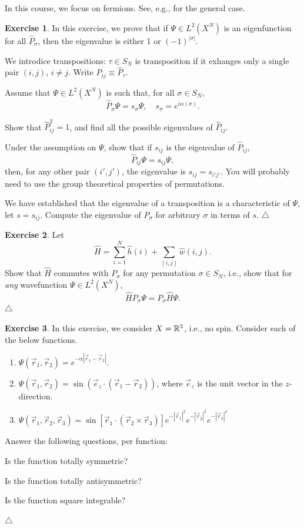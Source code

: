 \documentclass{report}
\theoremstyle{plain}
\theoremstyle{definition}
\newtheorem{exerc}{Exercise}[chapter]
\newcommand\xqed[1]{%
  \leavevmode\unskip\penalty9999 \hbox{}\nobreak\hfill
  \quad\hbox{#1}}
\newcommand\demo{\xqed{$\triangle$}}
\newenvironment{exercise}{\bigskip\begin{exerc}}{\demo\end{exerc}\bigskip}
\begin{document}
In this course, we focus on fermions. See, e.g.,
\cite{GRH} for the general case.

\begin{exercise}
  In this exercise, we prove that if $\Psi\in L^2(X^N)$ is an
  eigenfunction for all $\hat{P}_\sigma$, then the eigenvalue is
  either 1 or $(-1)^{|\sigma|}$.

  We introdice transpositions: $\tau \in S_N$ is transposition if it
  exhanges only a single pair $(i,j)$, $i\neq j$. Write $\hat{P}_{ij}
  \equiv \hat{P}_\tau$.

  Assume that $\Psi\in L^2(X^N)$ is such that, for all $\sigma\in
  S_N$,
  \[ \hat{P}_\sigma \Psi = s_\sigma \Psi, \quad s_\sigma =
  e^{i\alpha(\sigma)}. \]

  Show that $\hat{P}_{ij}^2 = 1$, and find all the possible eigenvalues of $\hat{P}_{ij}$.
  
  Under the assumption on $\Psi$, show that if $s_{ij}$ is the
  eigenvalue of $\hat{P}_{ij}$, 
  \[ \hat{P}_{ij} \Psi = s_{ij} \Psi, \]
  then, for any other pair $(i',j')$, the eigenvalue is $s_{ij} =
  s_{i'j'}$. You will probably need to use the group theoretical
  properties of permutations.

  We have established that the eigenvalue of a transposition is a
  characteristic of $\Psi$, let $s = s_{ij}$. Compute the
  eigenvalue of $P_\sigma$ for arbitrary $\sigma$ in terms of $s$.
\end{exercise}

\begin{exercise}
  Let
  \[ \hat{H} = \sum_{i=1}^N \hat{h}(i) + \sum_{(i,j)} \hat{w}(i,j).\]
  Show that $\hat{H}$ commutes with $P_\sigma$ for any
  permutation $\sigma \in S_N$, i.e., show that for \emph{any} wavefunction
  $\Psi \in L^2(X^N)$, 
  \begin{equation}
    \hat{H}P_\sigma \Psi = P_\sigma \hat{H} \Psi.
  \end{equation}
\end{exercise}

\begin{exercise}
  In this exercise, we consider $X = \mathbb{R}^3$, i.e., no spin.
  Consider each of the below functions.
  \begin{enumerate}
  \item 
    $\Psi(\vec{r}_1,\vec{r}_2) = e^{-\alpha|\vec{r}_1 - \vec{r}_2|}$.
  \item
    $\Psi(\vec{r}_1, \vec{r}_2) = \sin(\vec{e}_z \cdot(\vec{r}_1 -
    \vec{r}_2))$, where $\vec{e}_z$ is the unit vector in the
    $z$-direction.
  \item
    $\Psi(\vec{r}_1,\vec{r}_2,\vec{r}_3) =
    \sin[\vec{r}_1\cdot(\vec{r}_2\times\vec{r}_3)] e^{-|\vec{r}_1|^2}
    e^{-|\vec{r}_2|^2} e^{-|\vec{r}_3|^2}$
  \end{enumerate}
  Answer the following questions, per function:

  Is the function totally symmetric?

  Is the function totally antisymmetric?

  Is the function square integrable?
  
\end{exercise}
\end{document}
